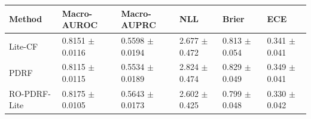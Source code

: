 \begin{tabular}{llllll}
\toprule
Method & Macro-AUROC & Macro-AUPRC & NLL & Brier & ECE \\
\midrule
Lite-CF & 0.8151 $\pm$ 0.0116 & 0.5598 $\pm$ 0.0194 & 2.677 $\pm$ 0.472 & 0.813 $\pm$ 0.054 & 0.341 $\pm$ 0.041 \\
PDRF & 0.8115 $\pm$ 0.0115 & 0.5534 $\pm$ 0.0189 & 2.824 $\pm$ 0.474 & 0.829 $\pm$ 0.049 & 0.349 $\pm$ 0.041 \\
RO-PDRF-Lite & 0.8175 $\pm$ 0.0105 & 0.5643 $\pm$ 0.0173 & 2.602 $\pm$ 0.425 & 0.799 $\pm$ 0.048 & 0.330 $\pm$ 0.042 \\
\bottomrule
\end{tabular}
